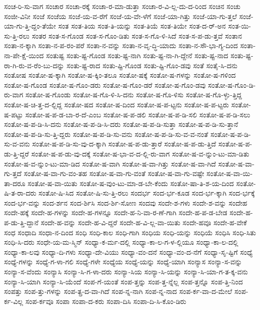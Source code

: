 {ಸಂಚ-ರಿ-ಸು-ವಾಗ
ಸಂಚಾರ
ಸಂಚಾ-ರಕ್ಕೆ
ಸಂಚಾ-ರ-ಮಾ-ಡುತ್ತಾ
ಸಂಚಾ-ರ-ವಿ-ಲ್ಲ-ದು-ದ-ರಿಂದ
ಸಂಚಿನ
ಸಂಚು
ಸಂಜೀ-ವಿನೀ
ಸಂಜೆ
ಸಂಜೆಯ
ಸಂಜೆ-ಯ-ವ-ರೆಗೆ
ಸಂಜೆ-ಯ-ವೇ-ಳೆಗೆ
ಸಂಜೆ-ಯಾ-ಗಿತ್ತು
ಸಂಜೆ-ಯಾ-ಗು-ತ್ತಲೆ
ಸಂಜೆ-ಯಾ-ಗು-ತ್ತಿ-ದ್ದಂ-ತೆಯೇ
ಸಂತ
ಸಂತ-ತಿಯ
ಸಂತ-ತಿ-ಯನ್ನು
ಸಂತ-ತಿಯೆ
ಸಂತ-ತಿಯೇ
ಸಂತ-ದ-ರ್-ಅನ
ಸಂತ-ಯಿ-ಸು-ತ್ತಿ-ರಲು
ಸಂತರ
ಸಂತ-ಸ-ಗೊಂಡ
ಸಂತ-ಸ-ಗೊಂ-ಡಿತು
ಸಂತ-ಸ-ಗೊ-ಳಿ-ಸಿದೆ
ಸಂತ-ಸ-ಪ-ಡು-ತ್ತವೆ
ಸಂತಾನ
ಸಂತಾ-ನ-ಕ್ಕಾಗಿ
ಸಂತಾ-ನ-ಪ-ರಂ-ಪರೆ
ಸಂತಾ-ನ-ವನ್ನು
ಸಂತಾ-ನ-ವೃ-ದ್ಧಿ-ಯಾದು
ಸಂತಾ-ನ-ಸೌ-ಭಾ-ಗ್ಯ-ದಿಂದ
ಸಂತಾ-ನಾ-ಪೇ-ಕ್ಷೆ-ಯಿಂದ
ಸಂತುಷ್ಟ
ಸಂತು-ಷ್ಟ-ಗೊಂಡ
ಸಂತು-ಷ್ಟ-ನಾಗಿ
ಸಂತು-ಷ್ಟ-ನಾ-ಗಿ-ದ್ದೇನೆ
ಸಂತು-ಷ್ಟ-ನಾದ
ಸಂತು-ಷ್ಟ-ರಾ-ಗಿ-ರು-ವ-ರೆಂ-ಬು-ದನ್ನು
ಸಂತು-ಷ್ಟ-ರಾದ
ಸಂತು-ಷ್ಟಿ-ಗೊಂಡ
ಸಂತು-ಷ್ಟಿ-ಗೊಂ-ಡವು
ಸಂತೆ
ಸಂತೈ-ಸಿ-ದನು
ಸಂತೋಷ
ಸಂತೋ-ಷ-ಕ್ಕಾಗಿ
ಸಂತೋ-ಷ-ಕ್ಕಿಂ-ತಲೂ
ಸಂತೋ-ಷಕ್ಕೆ
ಸಂತೋ-ಷ-ಗಳನ್ನು
ಸಂತೋ-ಷ-ಗಳಿಂದ
ಸಂತೋ-ಷ-ಗೊಂಡ
ಸಂತೋ-ಷ-ಗೊಂ-ಡರು
ಸಂತೋ-ಷ-ಗೊಂ-ಡರೆ
ಸಂತೋ-ಷ-ಗೊಂ-ಡವು
ಸಂತೋ-ಷ-ಗೊಂ-ಡಿ-ರು-ವಾಗ
ಸಂತೋ-ಷ-ಗೊಂಡು
ಸಂತೋ-ಷ-ಗೊ-ಳಿ-ಸಿ-ದನು
ಸಂತೋ-ಷ-ಗೊ-ಳಿಸು
ಸಂತೋ-ಷ-ಗೊ-ಳ್ಳು-ತ್ತಿದ್ದ
ಸಂತೋ-ಷ-ಚಿ-ತ್ತ-ದ-ಲ್ಲಿದ್ದ
ಸಂತೋ-ಷದ
ಸಂತೋ-ಷ-ದಿಂದ
ಸಂತೋ-ಷ-ಪ-ಟ್ಟನು
ಸಂತೋ-ಷ-ಪ-ಟ್ಟರು
ಸಂತೋ-ಷ-ಪಟ್ಟು
ಸಂತೋ-ಷ-ಪ-ಡ-ಬಾ-ರ-ದೆ-ಎಂಬ
ಸಂತೋ-ಷ-ಪ-ಡಲಿ
ಸಂತೋ-ಷ-ಪ-ಡಿ-ಸಲಿ
ಸಂತೋ-ಷ-ಪ-ಡಿ-ಸಲು
ಸಂತೋ-ಷ-ಪ-ಡಿ-ಸಿ-ದನು
ಸಂತೋ-ಷ-ಪ-ಡಿ-ಸಿ-ದರು
ಸಂತೋ-ಷ-ಪ-ಡಿ-ಸುತ್ತಾ
ಸಂತೋ-ಷ-ಪ-ಡಿ-ಸು-ತ್ತಾನೆ
ಸಂತೋ-ಷ-ಪ-ಡಿ-ಸು-ತ್ತಿ-ದ್ದರು
ಸಂತೋ-ಷ-ಪ-ಡಿ-ಸು-ವನು
ಸಂತೋ-ಷ-ಪ-ಡಿ-ಸು-ವ-ವ-ನಂತೆ
ಸಂತೋ-ಷ-ಪ-ಡಿ-ಸು-ವ-ವನು
ಸಂತೋ-ಷ-ಪ-ಡಿ-ಸು-ವು-ದ-ಕ್ಕಾಗಿ
ಸಂತೋ-ಷ-ಪ-ಡು-ತ್ತಾರೆ
ಸಂತೋ-ಷ-ಪ-ಡು-ತ್ತಿದೆ
ಸಂತೋ-ಷ-ಪ-ಡು-ತ್ತಿ-ದ್ದರೆ
ಸಂತೋ-ಷ-ಪ-ಡು-ವು-ದಕ್ಕೆ
ಸಂತೋ-ಷ-ಭಾ-ವ-ದ-ಲ್ಲಿ-ರು-ವಾಗ
ಸಂತೋ-ಷ-ವ-ನ್ನುಂ-ಟು-ಮಾ-ಡಿತು
ಸಂತೋ-ಷ-ವ-ನ್ನುಂ-ಟು-ಮಾ-ಡಿದ
ಸಂತೋ-ಷ-ವಾಗಿ
ಸಂತೋ-ಷ-ವಾ-ಗಿತ್ತು
ಸಂತೋ-ಷ-ವಾ-ಗಿದೆ
ಸಂತೋ-ಷ-ವಾ-ಗು-ತ್ತದೆ
ಸಂತೋ-ಷ-ವಾ-ಗು-ವಂ-ತಹ
ಸಂತೋ-ಷ-ವಾ-ಗು-ವಂತೆ
ಸಂತೋ-ಷ-ವಾ-ಗು-ವಷ್ಟೇ
ಸಂತೋ-ಷ-ವಾ-ಯಿ-ತಾ-ದರೂ
ಸಂತೋ-ಷ-ವಾ-ಯಿತು
ಸಂತೋ-ಷ-ವುಂ-ಟು-ಮಾ-ಡ-ಬೇ-ಕೆಂದು
ಸಂತೋ-ಷಾ-ತಿ-ಶ-ಯ-ದಿಂದ
ಸಂತೋ-ಷಿ-ತ-ರಾ-ದರು
ಸಂತೋ-ಷಿ-ಸಿದ
ಸಂತೋ-ಷಿ-ಸು-ತ್ತಿ-ರಲು
ಸಂದರ್ಭ
ಸಂದ-ರ್ಭ-ಕೂಡ
ಸಂದ-ರ್ಭ-ಕ್ಕಾಗಿ
ಸಂದ-ರ್ಭಕ್ಕೆ
ಸಂದ-ರ್ಭ-ವನ್ನು
ಸಂದ-ರ್ಶನ
ಸಂದ-ರ್ಶಿಸಿ
ಸಂದ-ರ್ಶಿ-ಸೋಣ
ಸಂದವು
ಸಂದೇ-ಶ-ಗಳು
ಸಂದೇ-ಶ-ವನ್ನು
ಸಂದೇಹ
ಸಂದೇ-ಹಕ್ಕೆ
ಸಂದೇ-ಹ-ಗಳನ್ನು
ಸಂದೇ-ಹ-ಗಳನ್ನೂ
ಸಂದೇ-ಹ-ನಿ-ವಾ-ರ-ಣೆ-ಗಾಗಿ
ಸಂದೇ-ಹ-ಪ-ಡ-ಬೇಡ
ಸಂದೇ-ಹ-ಪ-ಡು-ತ್ತಿ-ದ್ದಾನೆ
ಸಂದೇ-ಹ-ವನ್ನು
ಸಂದೇ-ಹ-ವಿ-ದ್ದರೆ
ಸಂದೇ-ಹ-ವಿ-ಲ್ಲ-ವಾ-ಯಿತು
ಸಂದೇ-ಹವೂ
ಸಂದೇ-ಹ-ವೇಕೆ
ಸಂಧ
ಸಂಧಾದಿ
ಸಂಧಾ-ನ-ದಿಂದ
ಸಂಧಿ
ಸಂಧಿ-ಕಾಲ
ಸಂಧಿ-ಗಾಗಿ
ಸಂಧಿಯ
ಸಂಧಿ-ಯನ್ನು
ಸಂಧಿಯೆ
ಸಂಧಿಸಿ
ಸಂಧಿ-ಸಿತು
ಸಂಧಿ-ಸಿ-ದರು
ಸಂಧೇ-ಯ-ಮ-ಸ್ಮಿನ್
ಸಂಧ್ಯಾ-ಕ-ರ್ಮ-ದಲ್ಲಿ
ಸಂಧ್ಯಾ-ಕಾ-ಲ-ಗ-ಳ-ಲ್ಲಿಯೂ
ಸಂಧ್ಯಾ-ಕಾ-ಲ-ದಲ್ಲಿ
ಸಂಧ್ಯಾ-ಕಾ-ಲವು
ಸಂಧ್ಯಾ-ದಿ-ಗಳು
ಸಂಧ್ಯಾ-ದೇ-ವಿಯು
ಸಂಧ್ಯಾ-ವಂ-ದನೆ
ಸಂಧ್ಯಾ-ವಂ-ದ-ನೆಗೆ
ಸಂಧ್ಯಾ-ಸೃ-ಷ್ಟಿಗೆ
ಸಂಧ್ಯೆ
ಸಂಧ್ಯೆ-ಗಳನ್ನು
ಸಂಧ್ಯೆ-ಗ-ಳಾ-ಗಲಿ
ಸಂಧ್ಯೆ-ಗಳೇ
ಸಂಧ್ಯೆಯ
ಸಂಧ್ಯೆ-ಯನ್ನು
ಸಂಧ್ಯೆ-ಯಾಗಿ
ಸಂನ್ಯಾಸ
ಸಂನ್ಯಾ-ಸ-ವನ್ನು
ಸಂನ್ಯಾ-ಸ-ವೆಂದು
ಸಂನ್ಯಾಸಿ
ಸಂನ್ಯಾ-ಸಿ-ಗ-ಳಾ-ದರು
ಸಂನ್ಯಾ-ಸಿಯ
ಸಂನ್ಯಾ-ಸಿ-ಯನ್ನು
ಸಂನ್ಯಾ-ಸಿ-ಯಾ-ಗ-ತ-ಕ್ಕ-ವನು
ಸಂನ್ಯಾ-ಸಿ-ಯಾಗಿ
ಸಂನ್ಯಾ-ಸಿ-ಯೆಂದೆ
ಸಂಪ-ಗೆ-ಯಂತೆ
ಸಂಪ-ತ್ತನ್ನು
ಸಂಪ-ತ್ತ-ನ್ನೆಲ್ಲ
ಸಂಪ-ತ್ತನ್ನೊ
ಸಂಪ-ತ್ತಿ-ನಿಂದ
ಸಂಪತ್ತು
ಸಂಪ-ತ್ತು-ಗಳನ್ನು
ಸಂಪ-ತ್ಪ್ರ-ದ-ವಾ-ಗಿದೆ
ಸಂಪ-ನ್ನ-ನಾಗಿ
ಸಂಪ-ನ್ನ-ನಾದ
ಸಂಪ-ರ್ಕ-ವಾ-ದ-ಮೇಲೆ
ಸಂಪ-ರ್ಕ-ವಿಲ್ಲ
ಸಂಪ-ರ್ಕವೂ
ಸಂಪಾ
ಸಂಪಾ-ದ-ಕರು
ಸಂಪಾ-ದಿಸಿ
ಸಂಪಾ-ದಿ-ಸಿ-ಕೊಂ-ಡಿರು
}

